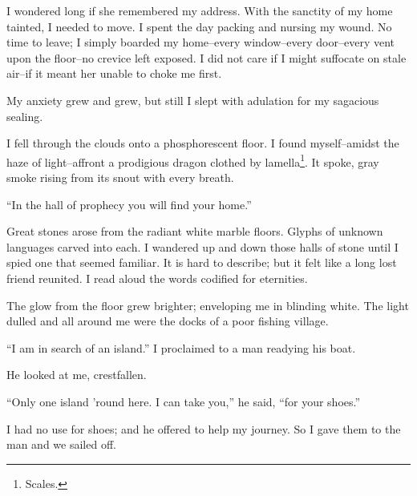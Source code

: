 \documentclass{article}
\begin{document}
I wondered long if she remembered my address.
With the sanctity of my home tainted, I needed to move.
I spent the day packing and nursing my wound.
No time to leave; I simply boarded my home--every
window--every door--every vent upon the floor--no
crevice left exposed.
I did not care if I might suffocate on stale air--if
it meant her unable to choke me first.


My anxiety grew and grew, but still I slept
with adulation for my sagacious sealing.
\vvvv


\noindent
I fell through the clouds onto a phosphorescent floor.
I found myself--amidst the haze of light--affront
a prodigious dragon clothed by lamella\footnote{Scales.}. %
It spoke, gray smoke rising from its snout with every breath.
\VV


``In the hall of prophecy you will find your home.''
\VV


\noindent
Great stones arose from the radiant white marble floors.
Glyphs of unknown languages carved into each.
I wandered up and down those halls of stone
until I spied one that seemed familiar.
It is hard to describe; but it felt like a long lost friend
reunited.  I read aloud the words codified for eternities.
\VV




\noindent
The glow from the floor grew brighter;
enveloping me in blinding white.
The light dulled and
all around me were the docks of a poor fishing village.
\VV


``I am in search of an island.''
I proclaimed to a man readying his boat.
\VV


\noindent
He looked at me, crestfallen.
\VV


``Only one island 'round here.
I can take you,'' he said, ``for your shoes.''
\VV


\noindent
I had no use for shoes; and he offered to help my journey.
So I gave them to the man and we sailed off.
\end{document}
